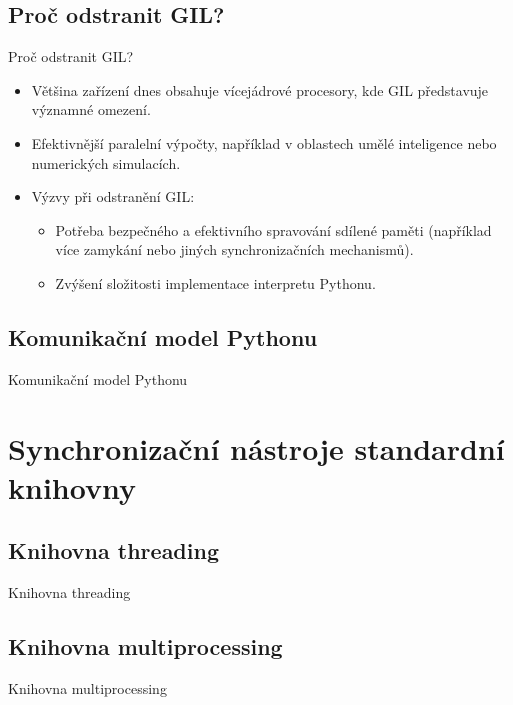 \documentclass{beamer}
\begin{document}
\subsection{Proč odstranit GIL?}
\begin{frame}{Proč odstranit GIL?}
	\begin{itemize}
		\item Většina zařízení dnes obsahuje vícejádrové procesory, kde GIL představuje významné omezení.
		\item Efektivnější paralelní výpočty, například v oblastech umělé inteligence nebo numerických simulacích.
		\item Výzvy při odstranění GIL:
		\begin{itemize}
			\item [\textendash] Potřeba bezpečného a efektivního spravování sdílené paměti (například více zamykání nebo jiných synchronizačních mechanismů).
			\item [\textendash] Zvýšení složitosti implementace interpretu Pythonu.
		\end{itemize}
	\end{itemize}
\end{frame}

\subsection{Komunikační model Pythonu}
\begin{frame}{Komunikační model Pythonu}

\end{frame}

\section{Synchronizační nástroje standardní knihovny}
\subsection{Knihovna threading}
\begin{frame}{Knihovna threading}


\end{frame}

\subsection{Knihovna multiprocessing}
\begin{frame}{Knihovna multiprocessing}

\end{frame}
\end{document}
